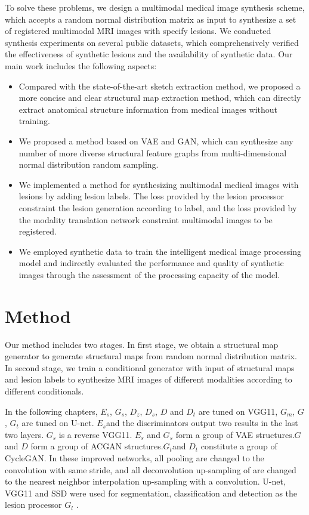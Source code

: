 \documentclass[runningheads]{llncs}
\begin{document}
	To solve these problems, we design a multimodal medical image synthesis scheme, which accepts a random normal distribution matrix as input to synthesize a set of registered multimodal MRI images with specify lesions. We conducted synthesis experiments on several public datasets, which comprehensively verified the effectiveness of synthetic lesions and the availability of synthetic data. Our main work includes the following aspects:
	\begin{itemize}
		\item Compared with the state-of-the-art sketch extraction method, we proposed a more concise and clear structural map extraction method, which can directly extract anatomical structure information from medical images without training.
		
		\item We proposed a method based on VAE and GAN, which can synthesize any number of more diverse structural feature graphs from multi-dimensional normal distribution random sampling.
		
		\item We implemented a method for synthesizing multimodal medical images with lesions by adding lesion labels. The loss provided by the lesion processor constraint the lesion generation according to label, and the loss provided by the modality translation network constraint multimodal images to be registered.
		
		\item We employed synthetic data to train the intelligent medical image processing model and indirectly evaluated the performance and quality of synthetic images through the assessment of the processing capacity of the model.
	\end{itemize}
	
	\section{Method}
	\label{method}
	Our method includes two stages. In first stage, we obtain a structural map generator to generate structural maps from random normal distribution matrix. In second stage, we train a conditional generator with input of structural maps and lesion labels to synthesize MRI images of different modalities according to different conditionals.
	
	In the following chapters, $E_s $, $G_s$, $D_{z} $, $D_{s} $, $D $ and $D_{t}$ are tuned on VGG11\cite{102simonyan2014very}, $G_m $, $G$, $G_t$ are tuned on U-net\cite{6zhu2017unpaired}. $E_s$and the discriminators output two results in the last two layers. $G_s$ is a reverse VGG11. $E_s $ and $G_s$ form a group of VAE\cite{88rezende2014stochastic} structures.$G$and $D$ form a group of ACGAN\cite{98odena2016conditional} structures.$G_t$and $D_t $ constitute a group of CycleGAN. In these improved networks, all pooling are changed to the convolution with same stride, and all deconvolution up-sampling of are changed to the nearest neighbor interpolation up-sampling with a convolution. U-net, VGG11 and SSD\cite{109liu2016ssd:} were used for segmentation, classification and detection as the lesion processor $G_l$ .
\end{document}
